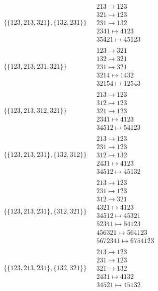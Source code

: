 \begin{scriptsize}
\begin{align}
\begin{matrix}
\end{matrix}
\\
\{\{123, 213, 321\}, \{132, 231\}\}
\ 
&
\begin{matrix}
213 \mapsto 123\\321 \mapsto 123\\231 \mapsto 132\\2341 \mapsto 4123\\35421 \mapsto 45123
\end{matrix}
\\
\{\{123, 213, 231, 321\}\}
\ 
&
\begin{matrix}
123 \mapsto 321\\132 \mapsto 321\\231 \mapsto 321\\3214 \mapsto 1432\\32154 \mapsto 12543
\end{matrix}
\\
\{\{123, 213, 312, 321\}\}
\ 
&
\begin{matrix}
213 \mapsto 123\\312 \mapsto 123\\321 \mapsto 123\\2341 \mapsto 4123\\34512 \mapsto 54123
\end{matrix}
\\
\{\{123, 213, 231\}, \{132, 312\}\}
\ 
&
\begin{matrix}
213 \mapsto 123\\231 \mapsto 123\\312 \mapsto 132\\2431 \mapsto 4123\\34512 \mapsto 45132
\end{matrix}
\\
\{\{123, 213, 231\}, \{312, 321\}\}
\ 
&
\begin{matrix}
213 \mapsto 123\\231 \mapsto 123\\312 \mapsto 321\\4321 \mapsto 4123\\34512 \mapsto 45321\\52341 \mapsto 54123\\456321 \mapsto 564123\\5672341 \mapsto 6754123
\end{matrix}
\\
\{\{123, 213, 231\}, \{132, 321\}\}
\ 
&
\begin{matrix}
213 \mapsto 123\\231 \mapsto 123\\321 \mapsto 132\\2431 \mapsto 4132\\34521 \mapsto 45132

\end{matrix}
\end{align}
\end{scriptsize}
